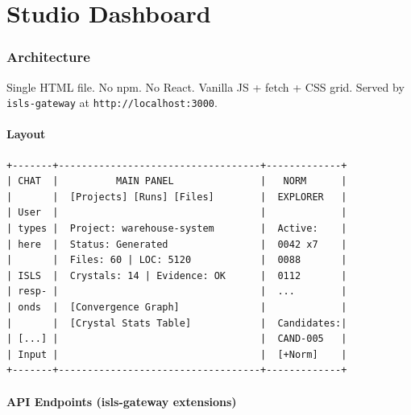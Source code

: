 \documentclass[11pt,a4paper]{article}
\begin{document}
\part{Studio Dashboard}
\label{part:studio}

\section{Architecture}

Single HTML file. No npm. No React. Vanilla JS + fetch + CSS grid.
Served by \texttt{isls-gateway} at \texttt{http://localhost:3000}.

\subsection{Layout}

\begin{lstlisting}
+-------+-----------------------------------+-------------+
| CHAT  |          MAIN PANEL               |   NORM      |
|       |  [Projects] [Runs] [Files]        |  EXPLORER   |
| User  |                                   |             |
| types |  Project: warehouse-system        |  Active:    |
| here  |  Status: Generated                |  0042 x7    |
|       |  Files: 60 | LOC: 5120            |  0088       |
| ISLS  |  Crystals: 14 | Evidence: OK      |  0112       |
| resp- |                                   |  ...        |
| onds  |  [Convergence Graph]              |             |
|       |  [Crystal Stats Table]            |  Candidates:|
| [...] |                                   |  CAND-005   |
| Input |                                   |  [+Norm]    |
+-------+-----------------------------------+-------------+
\end{lstlisting}

\subsection{API Endpoints (isls-gateway extensions)}
\end{document}
